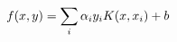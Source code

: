 \documentclass[preview]{standalone}
\begin{document}
\begin{align*}
\special{dvisvgm:raw <g id='unique000'>}f(x, y) = \sum_i \alpha_i y_i K(x, x_i) + b\special{dvisvgm:raw </g>}
\end{align*}
\end{document}
